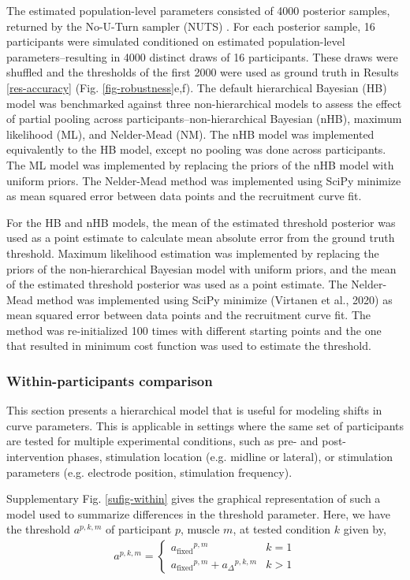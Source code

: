 \documentclass[sn-mathphys-ay]{sn-jnl}%
\theoremstyle{thmstyleone}%
\theoremstyle{thmstyletwo}%
\theoremstyle{thmstylethree}%
\begin{document}
\bigskip\noindent The estimated population-level parameters consisted of 4000 posterior samples, returned by the No-U-Turn sampler (NUTS) \cite{hoffman_no-u-turn_2011}. For each posterior sample, 16 participants were simulated conditioned on estimated population-level parameters--resulting in 4000 distinct draws of 16 participants. These draws were shuffled and the thresholds of the first 2000 were used as ground truth in Results \ref{res-accuracy} (Fig. \ref{fig-robustness}e,f). The default hierarchical Bayesian (HB) model was benchmarked against three non-hierarchical models to assess the effect of partial pooling across participants--non-hierarchical Bayesian (nHB), maximum likelihood (ML), and Nelder-Mead (NM). The nHB model was implemented equivalently to the HB model, except no pooling was done across participants. The ML model was implemented by replacing the priors of the nHB model with uniform priors. The Nelder-Mead method was implemented using SciPy minimize \cite{virtanen_scipy_2020} as mean squared error between data points and the recruitment curve fit.

For the HB and nHB models, the mean of the estimated threshold posterior was used as a point estimate to calculate mean absolute error from the ground truth threshold. Maximum likelihood estimation was implemented by replacing the priors of the non-hierarchical Bayesian model with uniform priors, and the mean of the estimated threshold posterior was used as a point estimate. The Nelder-Mead method was implemented using SciPy minimize (Virtanen et al., 2020) as mean squared error between data points and the recruitment curve fit. The method was re-initialized 100 times with different starting points and the one that resulted in minimum cost function was used to estimate the threshold.


\subsubsection{Within-participants comparison}
This section presents a hierarchical model that is useful for modeling shifts in curve parameters. This is applicable in settings where the same set of participants are tested for multiple experimental conditions, such as pre- and post-intervention phases, stimulation location (e.g. midline or lateral), or stimulation parameters (e.g. electrode position, stimulation frequency).

Supplementary Fig. \ref{sufig-within} gives the graphical representation of such a model used to summarize differences in the threshold parameter. Here, we have the threshold $a^{p,k,m}$ of participant $p$, muscle $m$, at tested condition $k$ given by,
\begin{align}
    a^{p, k, m} = \begin{cases}
        {{a}_\text{fixed}}^{p, m} & k = 1 \\
        {{a}_\text{fixed}}^{p, m} + {{a}_\Delta}^{p, k, m} & k > 1
    \end{cases}\label{eq424}
\end{align}
\end{document}
